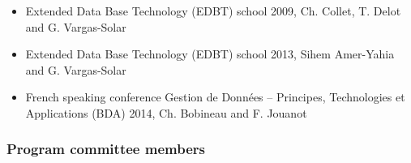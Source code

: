 \begin{itemize}
\setlength{\itemindent}{-0.5cm}
\setlength{\itemsep}{-0.1cm}
\item Extended Data Base Technology (EDBT) school 2009, Ch. Collet, T. Delot and G. Vargas-Solar

\item Extended Data Base Technology (EDBT) school 2013, Sihem Amer-Yahia and G. Vargas-Solar

\item French speaking conference Gestion de Donn\'ees – Principes, Technologies et Applications (BDA) 2014, Ch. Bobineau and F. Jouanot

\end{itemize}

\subsubsection*{Program committee members}

